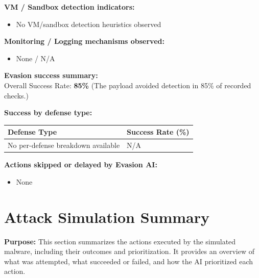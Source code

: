 \documentclass[a4paper,12pt]{article}
\begin{document}
\textbf{VM / Sandbox detection indicators:}
\begin{itemize}
    
        \item No VM/sandbox detection heuristics observed
    
\end{itemize}

\textbf{Monitoring / Logging mechanisms observed:}
\begin{itemize}
    
        \item None / N/A
    
\end{itemize}

\vspace{0.3cm}
\textbf{Evasion success summary:} \\
Overall Success Rate: \textbf{ 85\% }  
(The payload avoided detection in 85\% of recorded checks.)

\vspace{0.3cm}
\textbf{Success by defense type:}
\begin{longtable}{|p{6.5cm}|p{3cm}|}
\hline
\textbf{Defense Type} & \textbf{Success Rate (\%)} \\
\hline

    No per-defense breakdown available & N/A \\
\hline

\end{longtable}

\vspace{0.3cm}


\vspace{0.3cm}
\textbf{Actions skipped or delayed by Evasion AI:} \\
\begin{itemize}
    
        \item None
    
\end{itemize}

\newpage


\section*{Attack Simulation Summary}

\textbf{Purpose:} This section summarizes the actions executed by the simulated malware, including their outcomes and prioritization. It provides an overview of what was attempted, what succeeded or failed, and how the AI prioritized each action.
\end{document}
